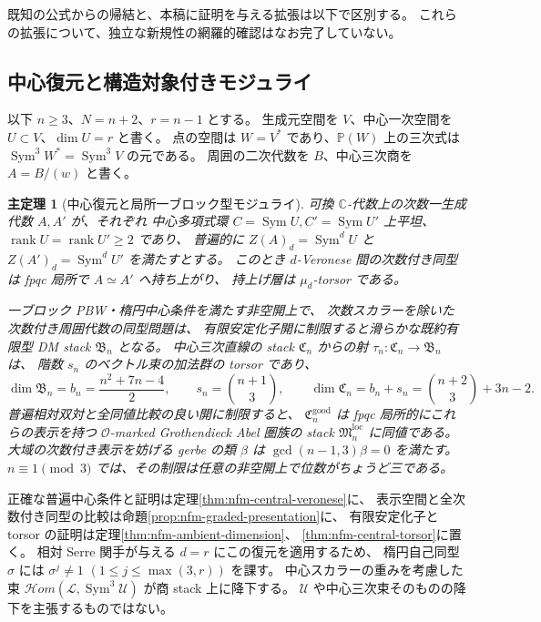 \documentclass[11pt,a4paper]{ltjsarticle}
\numberwithin{equation}{section}
\newtheorem{maintheorem}{主定理}
\newcommand{\C}{\mathbb C}
\newcommand{\PP}{\mathbb P}
\newcommand{\Sym}{\operatorname{Sym}}
\newcommand{\rank}{\operatorname{rank}}
\begin{document}
既知の公式からの帰結と、本稿に証明を与える拡張は以下で区別する。
これらの拡張について、独立な新規性の網羅的確認はなお完了していない。

\subsection{中心復元と構造対象付きモジュライ}
以下 $n\ge3$、$N=n+2$、$r=n-1$ とする。
生成元空間を $V$、中心一次空間を $U\subset V$、$\dim U=r$ と書く。
点の空間は $W=V^*$ であり、$\PP(W)$ 上の三次式は
$\Sym^3W^*=\Sym^3V$ の元である。
周囲の二次代数を $B$、中心三次商を $A=B/(w)$ と書く。

\begin{maintheorem}[中心復元と局所一ブロック型モジュライ]
可換 $\C$-代数上の次数一生成代数 $A,A'$ が、それぞれ
中心多項式環 $C=\Sym U,C'=\Sym U'$ 上平坦、
$\rank U=\rank U'\ge2$ であり、
普遍的に $Z(A)_d=\Sym^dU$ と $Z(A')_d=\Sym^dU'$ を満たすとする。
このとき $d$-Veronese 間の次数付き同型は fpqc 局所で $A\simeq A'$ へ持ち上がり、
持上げ層は $\mu_d$-torsor である。

一ブロック PBW・楕円中心条件を満たす非空開上で、
次数スカラーを除いた次数付き周囲代数の同型問題は、
有限安定化子開に制限すると滑らかな既約有限型 DM stack $\mathfrak B_n$ となる。
中心三次直線の stack $\mathfrak C_n$ からの射
$\tau_n:\mathfrak C_n\to\mathfrak B_n$ は、
階数 $s_n$ のベクトル束の加法群の torsor であり、
\[
 \dim\mathfrak B_n=b_n=\frac{n^2+7n-4}{2},\qquad
 s_n=\binom{n+1}{3},\qquad
 \dim\mathfrak C_n=b_n+s_n=\binom{n+2}{3}+3n-2.
\]
普遍相対双対と全同値比較の良い開に制限すると、
$\mathfrak C_n^{\mathrm{good}}$ は fpqc 局所的にこれらの表示を持つ
$\mathcal O$-marked Grothendieck Abel 圏族の stack
$\mathfrak M_n^{\mathrm{loc}}$ に同値である。
大域の次数付き表示を妨げる gerbe の類 $\beta$ は
$\gcd(n-1,3)\beta=0$ を満たす。
$n\equiv1\pmod3$ では、その制限は任意の非空開上で位数がちょうど三である。
\end{maintheorem}

正確な普遍中心条件と証明は定理\ref{thm:nfm-central-veronese}に、
表示空間と全次数付き同型の比較は命題\ref{prop:nfm-graded-presentation}に、
有限安定化子と torsor の証明は定理\ref{thm:nfm-ambient-dimension}、
\ref{thm:nfm-central-torsor}に置く。
相対 Serre 関手が与える $d=r$ にこの復元を適用するため、
楕円自己同型 $\sigma$ には
$\sigma^j\ne1$ $(1\le j\le\max(3,r))$ を課す。
中心スカラーの重みを考慮した束
$\mathcal Hom(\mathcal L,\Sym^3\mathcal U)$ が商 stack 上に降下する。
$\mathcal U$ や中心三次束そのものの降下を主張するものではない。
\end{document}

